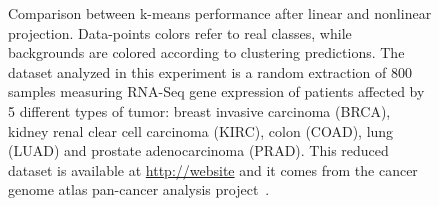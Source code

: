 \documentclass[twoside,11pt]{article}
\begin{document}
\begin{figure}[h!] 
    \centering
    \hfill%
\caption{Comparison between k-means performance after linear and nonlinear projection. Data-points colors refer to real classes, while backgrounds are colored according to clustering predictions. The dataset analyzed in this experiment is a random extraction of $800$ samples measuring RNA-Seq gene expression of patients affected by 5 different types of tumor: breast invasive carcinoma (BRCA), kidney renal clear cell carcinoma (KIRC), colon  (COAD), lung  (LUAD) and prostate adenocarcinoma (PRAD). This reduced dataset is available at \href{website}{http://website} and it comes from the cancer genome atlas pan-cancer analysis project~\citep{weinstein2013cancer}.} \label{fig:scatter}


\end{figure}




\end{document}
